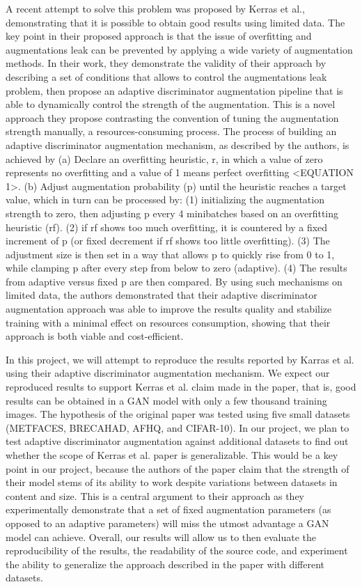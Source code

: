 \documentclass{report}
\begin{document}
A recent attempt to solve this problem was proposed by Kerras et al., demonstrating that it is possible to obtain good results using limited data. The key point in their proposed approach is that the issue of overfitting and augmentations leak can be prevented by applying a wide variety of augmentation methods. In their work, they demonstrate the validity of their approach by describing a set of conditions that allows to control the augmentations leak problem, then propose an adaptive discriminator augmentation pipeline that is able to dynamically control the strength of the augmentation. This is a novel approach they propose contrasting the convention of tuning the augmentation strength manually, a resources-consuming process. The process of building an adaptive discriminator augmentation mechanism, as described by the authors, is achieved by 
(a) Declare an overfitting heuristic, r, in which a value of zero represents no overfitting and a value of 1 means perfect overfitting <EQUATION 1>.
(b) Adjust augmentation probability (p) until the heuristic reaches a target value, which in turn can be processed by:
(1) initializing the augmentation strength to zero, then adjusting p every 4 minibatches based on an overfitting heuristic (rf).
(2) if rf shows too much overfitting, it is countered by a fixed increment of p (or fixed decrement if rf shows too little overfitting).
(3) The adjustment size is then set in a way that allows p to quickly rise from 0 to 1, while clamping p after every step from below to zero (adaptive).
(4) The results from adaptive versus ﬁxed p are then compared.
By using such mechanisms on limited data, the authors demonstrated that their adaptive discriminator augmentation approach was able to improve the results quality and stabilize training with a minimal effect on resources consumption, showing that their approach is both viable and cost-efficient.


In this project, we will attempt to reproduce the results reported by Karras et al.  using their adaptive discriminator augmentation mechanism. We expect our reproduced results to support Kerras et al. claim made in the paper, that is, good results can be obtained in a GAN model with only a few thousand training images. The hypothesis of the original paper was tested using five small datasets (METFACES, BRECAHAD, AFHQ, and CIFAR-10). In our project, we plan to test adaptive discriminator augmentation against additional datasets to find out whether the scope of Kerras et al. paper is generalizable. This would be a key point in our project, because the authors of the paper claim that the strength of their model stems of its ability to work despite variations between datasets in content and size. This is a central argument to their approach as they experimentally demonstrate that a set of ﬁxed augmentation parameters (as opposed to an adaptive parameters) will miss the utmost advantage a GAN model can achieve. Overall, our results will allow us to then evaluate the reproducibility of the results, the readability of the source code, and experiment the ability to generalize the approach described in the paper with different datasets.
\end{document}
